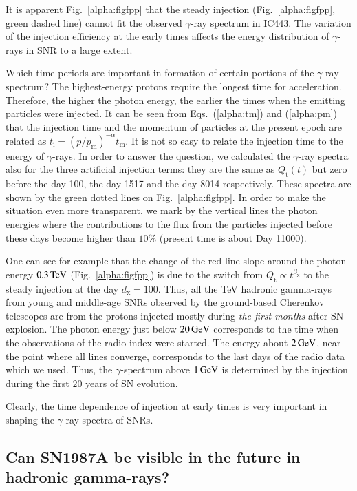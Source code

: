 \documentclass{aa}
\newcommand\un[1]{{\,\rm #1}}
\newcommand\rs[1]{_\mathrm{#1}}
\newcommand\g{$\gamma$}
\begin{document}
It is apparent Fig.~\ref{alpha:figfpp} that the steady injection (Fig.~\ref{alpha:figfpp}, green dashed line) cannot fit the observed \g-ray spectrum in IC443. 
The variation of the injection efficiency at the early times affects the energy distribution of \g-rays in SNR to a large extent. 

Which time periods are important in formation of certain portions of the \g-ray spectrum? The highest-energy protons require the longest time for acceleration. Therefore, the higher the photon energy, the earlier the times when the emitting particles were injected. It can be seen from Eqs.~(\ref{alpha:tm}) and (\ref{alpha:pm}) that the injection time and the momentum of particles at the present epoch are related as $t\rs{i}=(p/p\rs{m})^{-\alpha}t\rs{m}$. It is not so easy to relate the injection time to the energy of \g-rays. In order to answer the question, we calculated the \g-ray spectra also for the three artificial injection terms: they are the same as $Q\rs{t}(t)$ but zero before the day 100, the day 1517 and the day 8014 respectively. These spectra are shown by the green dotted lines on Fig.~\ref{alpha:figfpp}. In order to make the situation even more transparent, we mark by the vertical lines the photon energies where the contributions to the flux from the particles injected before these days become higher than $10\%$ (present time is about Day 11000). 

One can see for example that the change of the red line slope around the photon energy $0.3\un{TeV}$ (Fig.~\ref{alpha:figfpp}) is due to the switch from $Q\rs{t}\propto t^{\beta\rs{x}}$ to the steady injection at the day $d\rs{x}=100$. Thus, all the TeV hadronic gamma-rays from young and middle-age SNRs observed by the ground-based Cherenkov telescopes are from the protons injected mostly during {\it the first months} after SN explosion. The photon energy just below $20\un{GeV}$ corresponds to the time when the observations of the radio index were started. The energy about $2\un{GeV}$, near the point where all lines converge, corresponds to the last days of the radio data which we used. Thus, the \g-spectrum above $1\un{GeV}$ is determined by the injection during the first $20$ years of SN evolution. 

Clearly, the time dependence of injection at early times is very important in shaping the \g-ray spectra of SNRs.  


\subsection{Can SN1987A be visible in the future in hadronic gamma-rays?}
\end{document}
